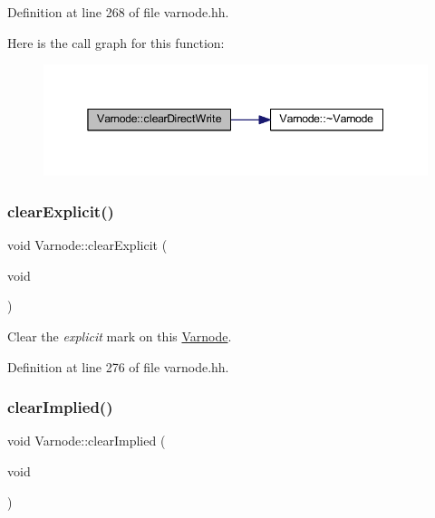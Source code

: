 Definition at line 268 of file varnode.\+hh.

Here is the call graph for this function\+:
\nopagebreak
\begin{figure}[H]
\begin{center}
\leavevmode
\includegraphics[width=345pt]{class_varnode_a5f2388a48093153cbe4726a582fb93b0_cgraph}
\end{center}
\end{figure}
\mbox{\label{class_varnode_a6888c038caae03864e546019018af619}} 
\subsubsection{\texorpdfstring{clearExplicit()}{clearExplicit()}}
{\footnotesize\ttfamily void Varnode\+::clear\+Explicit (\begin{DoxyParamCaption}\item[{void}]{ }\end{DoxyParamCaption})\hspace{0.3cm}{\ttfamily [inline]}}



Clear the {\itshape explicit} mark on this \mbox{\hyperlink{class_varnode}{Varnode}}. 



Definition at line 276 of file varnode.\+hh.

\mbox{\label{class_varnode_a96b03abe7bd0167af9e1f3973da7fafd}} 
\subsubsection{\texorpdfstring{clearImplied()}{clearImplied()}}
{\footnotesize\ttfamily void Varnode\+::clear\+Implied (\begin{DoxyParamCaption}\item[{void}]{ }\end{DoxyParamCaption})\hspace{0.3cm}{\ttfamily [inline]}}



